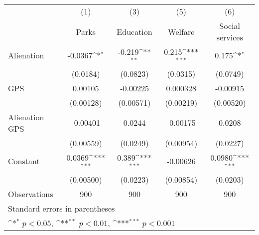 {
\def\sym#1{\ifmmode^{#1}\else\(^{#1}\)\fi}
\begin{tabular}{l*{4}{c}}
\hline\hline
                    &\multicolumn{1}{c}{(1)}&\multicolumn{1}{c}{(3)}&\multicolumn{1}{c}{(5)}&\multicolumn{1}{c}{(6)}\\
                    &\multicolumn{1}{c}{Parks}&\multicolumn{1}{c}{ Education}&\multicolumn{1}{c}{Welfare}&\multicolumn{1}{c}{Social services}\\
\hline
Alienation          &     -0.0367\sym{*}      &      -0.219\sym{**} &       0.215\sym{***}&       0.175\sym{*}  \\
                    &    (0.0184)        &    (0.0823)  &    (0.0315)         &    (0.0749)         \\
[1em]
GPS                 &     0.00105   &    -0.00225       &    0.000328         &    -0.00915         \\
                    &   (0.00128)        &   (0.00571)       &   (0.00219)         &   (0.00520)         \\
[1em]
Alienation  GPS      &    -0.00401    &      0.0244     &    -0.00175         &      0.0208         \\
                    &   (0.00559)          &    (0.0249)       &   (0.00954)         &    (0.0227)         \\
[1em]
Constant            &      0.0369\sym{***}&       0.389\sym{***}&    -0.00626         &      0.0980\sym{***}\\
                    &   (0.00500)         &    (0.0223)        &   (0.00854)         &    (0.0203)         \\
\hline
Observations        &         900     &         900        &         900         &         900         \\
\hline\hline
\multicolumn{5}{l}{\footnotesize Standard errors in parentheses}\\
\multicolumn{5}{l}{\footnotesize \sym{*} \(p<0.05\), \sym{**} \(p<0.01\), \sym{***} \(p<0.001\)}\\
\end{tabular}
}
